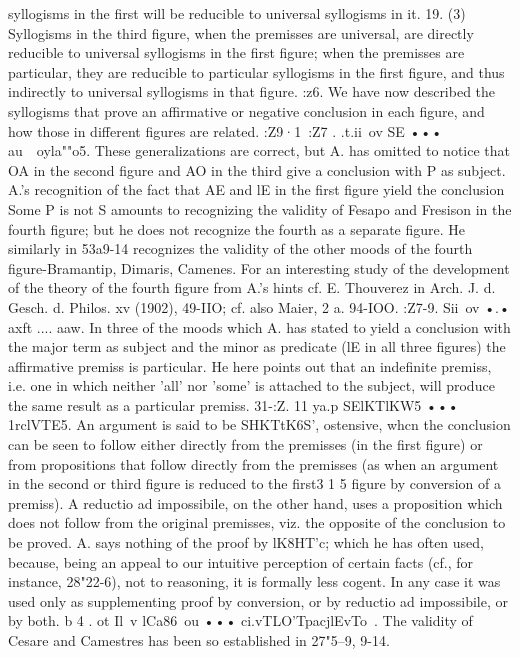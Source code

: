 {syllogisms in the first will be reducible to universal syllogisms in it.
19. (3) Syllogisms in the third figure, when the premisses are
universal, are directly reducible to universal syllogisms in the first
figure; when the premisses are particular, they are reducible to
particular syllogisms in the first figure, and thus indirectly to
universal syllogisms in that figure.
:z6. We have now described the syllogisms that prove an
affirmative or negative conclusion in each figure, and how those
in different figures are related.
:Z9·1~:Z7 . .t.ii~ov SE ••• au~~oyla""o5.
These generalizations
are correct, but A. has omitted to notice that OA in the second
figure and AO in the third give a conclusion with P as subject.
A.'s recognition of the fact that AE and lE in the first figure
yield the conclusion Some P is not S amounts to recognizing the
validity of Fesapo and Fresison in the fourth figure; but he does
not recognize the fourth as a separate figure. He similarly in
53a9-14 recognizes the validity of the other moods of the fourth
figure-Bramantip, Dimaris, Camenes. For an interesting study
of the development of the theory of the fourth figure from A.'s
hints cf. E. Thouverez in Arch. J. d. Gesch. d. Philos. xv (1902),
49-IIO; cf. also Maier, 2 a. 94-IOO.
:Z7-9. Sii~ov •.• axft .... aaw. In three of the moods which A.
has stated to yield a conclusion with the major term as subject
and the minor as predicate (lE in all three figures) the affirmative
premiss is particular. He here points out that an indefinite
premiss, i.e. one in which neither 'all' nor 'some' is attached to
the subject, will produce the same result as a particular premiss.
31-:Z. 11 ya.p SElKTlKW5 ••• 1rclVTE5. An argument is said to be
SHKTtK6S', ostensive, whcn the conclusion can be seen to follow
either directly from the premisses (in the first figure) or from
propositions that follow directly from the premisses (as when
an argument in the second or third figure is reduced to the first3 1 5
figure by conversion of a premiss). A reductio ad impossibile, on
the other hand, uses a proposition which does not follow from
the original premisses, viz. the opposite of the conclusion to be
proved.
A. says nothing of the proof by lK8HT'c; which he has often used,
because, being an appeal to our intuitive perception of certain
facts (cf., for instance, 28"22-6), not to reasoning, it is formally
less cogent. In any case it was used only as supplementing proof
by conversion, or by reductio ad impossibile, or by both.
b 4 . ot Il~v lCa86~ou ••• ci.vTLO'TpacjlEvTo~. The validity of Cesare
and Camestres has been so established in 27"5--9, 9-14.
}
